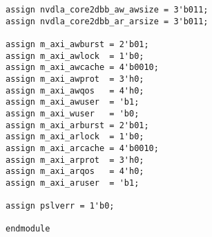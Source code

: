 \begin{lstlisting}
assign nvdla_core2dbb_aw_awsize = 3'b011;
assign nvdla_core2dbb_ar_arsize = 3'b011;

assign m_axi_awburst = 2'b01;
assign m_axi_awlock  = 1'b0;
assign m_axi_awcache = 4'b0010;
assign m_axi_awprot  = 3'h0;
assign m_axi_awqos   = 4'h0;
assign m_axi_awuser  = 'b1;
assign m_axi_wuser   = 'b0;
assign m_axi_arburst = 2'b01;
assign m_axi_arlock  = 1'b0;
assign m_axi_arcache = 4'b0010;
assign m_axi_arprot  = 3'h0;
assign m_axi_arqos   = 4'h0;
assign m_axi_aruser  = 'b1;

assign pslverr = 1'b0;

endmodule
\end{lstlisting}
